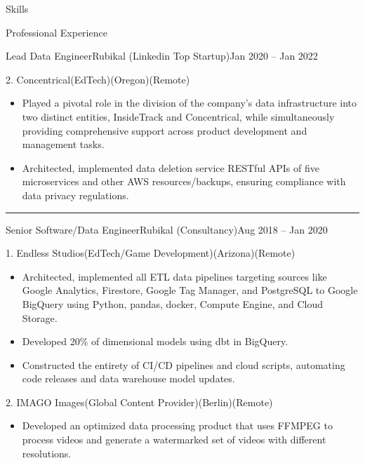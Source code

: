 \documentclass[]{ahmedamrcv}
\begin{document}
\begin{cvsection}{Skills}
\begin{cvsection}{Professional Experience}
\begin{cvsubsection}{Lead Data Engineer}{Rubikal (Linkedin Top Startup)}{Jan 2020 -- Jan 2022}
                \begin{cvsubsection}{2. Concentrical}{(EdTech)}{(Oregon)(Remote)}
    			\begin{itemize}
    				\item Played a pivotal role in the division of the company's data infrastructure into two distinct entities, InsideTrack and Concentrical, while simultaneously providing comprehensive support across product development and management tasks.
    				\item Architected, implemented data deletion service RESTful APIs of five microservices and other AWS resources/backups, ensuring compliance with data privacy regulations.
    			\end{itemize}
    		\end{cvsubsection}
            
            \end{cvsubsection}

            \centering\rule{300pt}{0.4pt}
            
            \begin{cvsubsection}{Senior Software/Data Engineer}{Rubikal (Consultancy)}{Aug 2018 -- Jan 2020}

            \begin{cvsubsection}{1. Endless Studios}{(EdTech/Game Development)}{(Arizona)(Remote)}	
			\begin{itemize}
				\item Architected, implemented all ETL data pipelines targeting sources like Google Analytics, Firestore, Google Tag Manager, and PostgreSQL to Google BigQuery using Python, pandas, docker, Compute Engine, and Cloud Storage.
				\item Developed 20\% of dimensional models using dbt in BigQuery.
				\item Constructed the entirety of CI/CD pipelines and cloud scripts, automating code releases and data warehouse model updates.
			\end{itemize}
		\end{cvsubsection}

		\begin{cvsubsection}{2. IMAGO Images}{(Global Content Provider)}{(Berlin)(Remote)}	
			\begin{itemize}
				\item Developed an optimized data processing product that uses FFMPEG to process videos and generate a watermarked set of videos with different resolutions.
			\end{itemize}
		\end{cvsubsection}


\end{cvsubsection}
\end{cvsection}
\end{cvsection}
\end{document}
